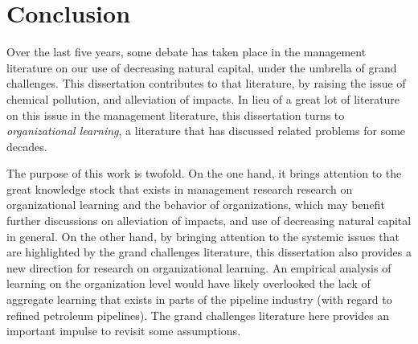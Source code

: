 \section{Conclusion}

Over the last five years, some debate has taken place in the management literature on our use of decreasing natural capital, under the umbrella of grand challenges. This dissertation contributes to that literature, by raising the issue of chemical pollution, and alleviation of impacts. In lieu of a great lot of literature on this issue in the management literature, this dissertation turns to \textit{organizational learning}, a literature that has discussed related problems for some decades.

The purpose of this work is twofold. On the one hand, it brings attention to the great knowledge stock that exists in management research research on organizational learning and the behavior of organizations, which may benefit further discussions on alleviation of impacts, and use of decreasing natural capital in general. On the other hand, by bringing attention to the systemic issues that are highlighted by the grand challenges literature, this dissertation also provides a new direction for research on organizational learning. An empirical analysis of learning on the organization level would have likely overlooked the lack of aggregate learning that exists in parts of the pipeline industry (with regard to refined petroleum pipelines). The grand challenges literature here provides an important impulse to revisit some assumptions.